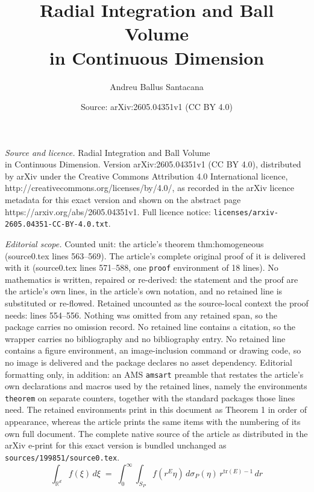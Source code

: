 \documentclass[10pt,a4paper]{amsart}
\title{Radial Integration and Ball Volume\\ in Continuous Dimension}
\author{Andreu Ballus Santacana}
\date{Source: arXiv:2605.04351v1 (CC BY 4.0)}
\newcommand{\R}{\mathbb{R}}
\begin{document}
\maketitle

\noindent\emph{Source and licence.} Radial Integration and Ball Volume\\ in Continuous Dimension. Version arXiv:2605.04351v1 (CC BY 4.0), distributed by arXiv under the Creative Commons Attribution 4.0 International licence, http://creativecommons.org/licenses/by/4.0/, as recorded in the arXiv licence metadata for this exact version and shown on the abstract page https://arxiv.org/abs/2605.04351v1. Full licence notice: \texttt{licenses/arxiv-2605.04351-CC-BY-4.0.txt}.\par\smallskip

\noindent\textit{Editorial scope.} Counted unit: the article's theorem thm:homogeneous (source0.tex lines 563--569). The article's complete original proof of it is delivered with it (source0.tex lines 571--588, one \texttt{proof} environment of 18 lines). No mathematics is written, repaired or re-derived: the statement and the proof are the article's own lines, in the article's own notation, and no retained line is substituted or re-flowed.  Retained uncounted as the source-local context the proof needs: lines 554--556.  Nothing was omitted from any retained span, so the package carries no omission record.  No retained line contains a citation, so the wrapper carries no bibliography and no bibliography entry.  No retained line contains a figure environment, an image-inclusion command or drawing code, so no image is delivered and the package declares no asset dependency.  Editorial formatting only, in addition: an AMS \texttt{amsart} preamble that restates the article's own declarations and macros used by the retained lines, namely the environments \texttt{theorem} on separate counters, together with the standard packages those lines need.  The retained environments print in this document as Theorem 1 in order of appearance, whereas the article prints the same items with the numbering of its own full document.  The complete native source of the article as distributed in the arXiv e-print for this exact version is bundled unchanged as \texttt{sources/199851/source0.tex}.
\begin{equation}\label{eq:bui-randles-polar}
\int_{\R^d} f(\xi)\,d\xi \;=\; \int_0^\infty\!\int_{S_P} f(r^E\eta)\,d\sigma_P(\eta)\,r^{\mathrm{tr}(E)-1}\,dr
\end{equation}
\end{document}
